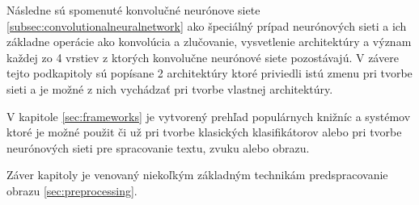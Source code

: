 Následne sú spomenuté konvolučné neurónove siete \ref{subsec:convolutionalneuralnetwork} ako špeciálný prípad neurónových sieti a ich základne operácie ako konvolúcia a zlučovanie,
    vysvetlenie architektúry a význam každej zo 4 vrstiev z ktorých konvolučne neurónové siete pozostávajú.
V závere tejto podkapitoly sú popísane 2 architektúry ktoré priviedli istú zmenu pri tvorbe sieti a je možné z nich vychádzať pri tvorbe vlastnej architektúry.

V kapitole \ref{sec:frameworks} je vytvorený prehľad populárnych knižníc a systémov ktoré je možné použit či už pri tvorbe klasických klasifikátorov alebo
    pri tvorbe neurónových sieti pre spracovanie textu, zvuku alebo obrazu.

Záver kapitoly je venovaný niekoľkým základným technikám predspracovanie obrazu \ref{sec:preprocessing}.
